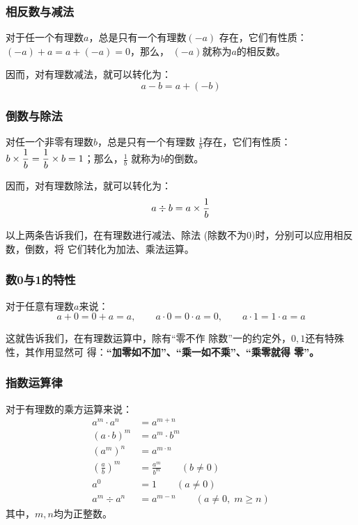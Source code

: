 \subsubsection{相反数与减法}
\begin{blk}{}
对于任一个有理数$a$，总是只有一个有理数$(-a)$
存在，它们有性质：$(-a) +a=a+(-a)=0$，那么，
$(-a)$就称为$a$的相反数。
\end{blk}

因而，对有理数减法，就可以转化为：
        \[a-b=a+(-b)\]

\subsubsection{倒数与除法}
\begin{blk}{}
 对任一个非零有理数$b$，总是只有一个有理数
$\frac{1}{b}$存在，它们有性质：$b\times\dfrac{1}{b}= \dfrac{1}{b} \times b=1$；那么，$\frac{1}{b}$
就称为$b$的倒数。
\end{blk}

因而，对有理数除法，就可以转化为：
\[a\div b=a\times\dfrac{1}{b}\]

以上两条告诉我们，在有理数进行减法、除法
(除数不为0)时，分别可以应用相反数，倒数，将
它们转化为加法、乘法运算。

\subsubsection{数0与1的特性}
\begin{blk}{}
    对于任意有理数$a$来说：
\[a+0=0+a=a,\qquad  a\cdot 0=0\cdot a=0,\qquad a\cdot 1=1\cdot a=a\]
\end{blk}

    这就告诉我们，在有理数运算中，除有“零不作
除数”一的约定外，$0,  1$还有特殊性，其作用显然可
得：\textbf{“加零如不加”、“乘一如不乘”、“乘零就得
零”。}

\subsubsection{指数运算律}
    \begin{blk}{}
    对于有理数的乘方运算来说：
\[\begin{split}
a^m\cdot a^n&=a^{m+n}\\
(a\cdot b)^m&=a^{m}\cdot b^m\\
(a^m)^n&=a^{m\cdot n}\\
\left(\frac{a}{b}\right)^m&=\frac{a^m}{b^m}\qquad (b\ne 0)\\
a^0&=1\qquad (a\ne 0)\\
a^m\div a^n&=a^{m-n} \qquad (a\ne 0,\; m\ge n)
\end{split}\]
其中，$m, n$均为正整数。
    \end{blk}

